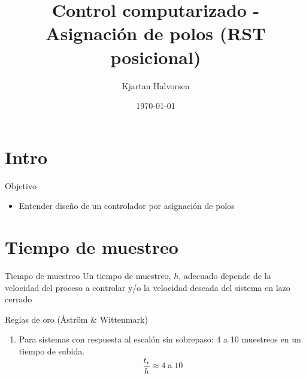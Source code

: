 \documentclass[presentation,aspectratio=169]{beamer}
\author{Kjartan Halvorsen}
\date{\today}
\title{Control computarizado - Asignación de polos (RST posicional)}
\begin{document}
\maketitle

\section{Intro}
\label{sec:orgc4185b7}

\begin{frame}[label={sec:org3805c86}]{Objetivo}
\begin{itemize}
\item Entender diseño de un controlador por asignación de polos
\end{itemize}
\end{frame}

\section{Tiempo de muestreo}
\label{sec:orgbbe9c12}
\begin{frame}[label={sec:orgd550073}]{Tiempo de muestreo}
\alert{Un tiempo de muestreo, \(h\), adecuado depende de la velocidad del proceso a controlar y/o la velocidad deseada del sistema en lazo cerrado}  
\begin{block}{Reglas de oro (Åström \& Wittenmark)}
\begin{enumerate}
\item Para sistemas con respuesta al escalón \alert{sin} sobrepaso: \alert{4 a 10} muestreos en un tiempo de subida. \[ \frac{t_r}{h} \approx 4 \; \text{a} \; 10 \]
\begin{center}
\def\TT{1}
\pgfmathsetmacro{\hh}{\TT/6}
\end{center}
\end{enumerate}
\end{block}
\end{frame}
\end{document}
